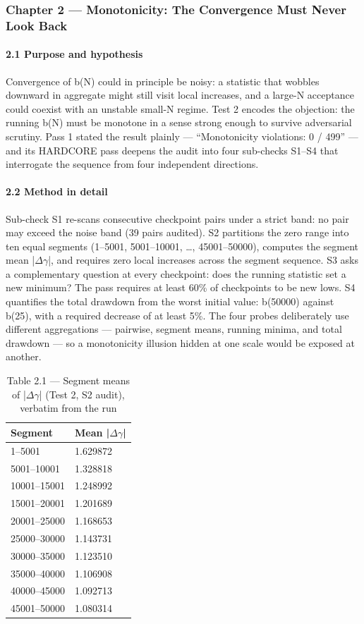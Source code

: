\documentclass[10pt]{article}
\begin{document}
\subsubsection{Chapter 2 --- Monotonicity: The Convergence Must Never Look Back}

\paragraph{2.1 Purpose and hypothesis}

Convergence of b(N) could in principle be noisy: a statistic that wobbles downward in aggregate might still visit local increases, and a large-N acceptance could coexist with an unstable small-N regime. Test 2 encodes the objection: the running b(N) must be monotone in a sense strong enough to survive adversarial scrutiny. Pass 1 stated the result plainly --- ``Monotonicity violations: 0 / 499'' --- and its HARDCORE pass deepens the audit into four sub-checks S1--S4 that interrogate the sequence from four independent directions.

\paragraph{2.2 Method in detail}

Sub-check S1 re-scans consecutive checkpoint pairs under a strict band: no pair may exceed the noise band (39 pairs audited). S2 partitions the zero range into ten equal segments (1--5001, 5001--10001, \ldots{}, 45001--50000), computes the segment mean |$\Delta$$\gamma$|, and requires zero local increases across the segment sequence. S3 asks a complementary question at every checkpoint: does the running statistic set a new minimum? The pass requires at least 60\% of checkpoints to be new lows. S4 quantifies the total drawdown from the worst initial value: b(50000) against b(25), with a required decrease of at least 5\%. The four probes deliberately use different aggregations --- pairwise, segment means, running minima, and total drawdown --- so a monotonicity illusion hidden at one scale would be exposed at another.

\begin{table}[htbp]
\centering
\small
\caption{Table 2.1 --- Segment means of |$\Delta$$\gamma$| (Test 2, S2 audit), verbatim from the run}
\begin{tabular}{ll}
\toprule
\textbf{Segment} & \textbf{Mean |$\Delta$$\gamma$|} \\
\midrule
1--5001 & 1.629872 \\
5001--10001 & 1.328818 \\
10001--15001 & 1.248992 \\
15001--20001 & 1.201689 \\
20001--25000 & 1.168653 \\
25000--30000 & 1.143731 \\
30000--35000 & 1.123510 \\
35000--40000 & 1.106908 \\
40000--45000 & 1.092713 \\
45001--50000 & 1.080314 \\
\bottomrule
\end{tabular}
\end{table}
\end{document}
